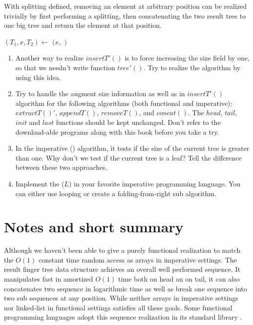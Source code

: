 \documentclass[UTF8]{article}
\begin{document}
With splitting defined, removing an element at arbitrary position can be realized trivially
by first performing a splitting, then concatenating the two result tree to one big tree and return
the element at that position.

\begin{algorithmic}
  \State $(T_1, x, T_2) \gets$ 
  \State \Return $(x, $  $)$
\EndFunction
\end{algorithmic}

\begin{Exercise}
\begin{enumerate}
\item Another way to realize $insertT'()$ is to force increasing the size field by one, so
that we needn't write function $tree'()$. Try to realize the algorithm by using this idea.

\item Try to handle the augment size information as well as in $insertT'()$ algorithm for
the following algorithms (both functional and imperative): $extractT()'$, $appendT()$, $removeT()$, and $concat()$. The $head$, $tail$,
$init$ and $last$ functions should be kept unchanged. Don't refer to the download-able
programs along with this book before you take a try.

\item In the imperative () algorithm, it tests if the size of the
current tree is greater than one. Why don't we test if the current tree is
a leaf? Tell the difference between these two approaches.

\item Implement the ($L$) in your favorite imperative programming language.
You can either use looping or create a folding-from-right sub algorithm.
\end{enumerate}
\end{Exercise}

\section{Notes and short summary}

Although we haven't been able to give a purely functional realization to match the
$O(1)$ constant time random access as arrays in imperative settings. The result
finger tree data structure achieves an overall well performed sequence.
It manipulates fast in amortized $O(1)$ time both on head an on tail, it can also
concatenates two sequence in logarithmic time as well as break one sequence into
two sub sequences at any position. While neither arrays in imperative settings
nor linked-list in functional settings satisfies all these goals.
Some functional programming languages adopt this sequence realization in its
standard library \cite{hackage-ftr}.
\end{document}
